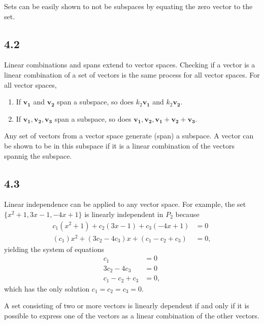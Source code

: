 \documentclass{article}
\begin{document}
    Sets can be easily shown to not be subspaces by equating the zero vector to the set.

    \subsection*{4.2}
    Linear combinations and spans extend to vector spaces. 
    Checking if a vector is a linear combination of a set of vectors 
    is the same process for all vector spaces.
    For all vector spaces,
    \begin{enumerate}
        \item If $\mathbf{v_1}$ and $\mathbf{v_2}$ span a subspace, so does $k_2 \mathbf{v_1}$ and $k_2 \mathbf{v_2}$.
        \item If $\mathbf{v_1, v_2, v_3}$ span a subspace, so does $\mathbf{v_1, v_2, v_1 + v_2 + v_3}$.
    \end{enumerate}

    Any set of vectors from a vector space generate (span) a subspace.
    A vector can be shown to be in this subspace if it is a linear combination of the vectors spannig the subspace.

    \subsection*{4.3}
    Linear independence can be applied to any vector space.
    For example, 
    the set $\{x^2 + 1, 3x - 1, -4x +  1\}$ is linearly independent in $P_2$ 
    because 
    \begin{align*}
        c_1(x^2 + 1) + c_2(3x - 1) + c_3(-4x + 1) &= 0 \\
        (c_1)x^2 + (3c_2 - 4c_3)x + (c_1 - c_2 + c_3) &= 0,
    \end{align*}
    yielding the system of equations
    \begin{align*}
        c_1 &= 0 \\
        3c_2 - 4c_3 &= 0 \\
        c_1 - c_2 + c_3 &= 0,
    \end{align*}
    which has the only solution $c_1 = c_2 = c_3 = 0$.

    A set consisting of two or more vectors is linearly dependent if and only if  
    it is possible to express one of the vectors as a linear combination of the other vectors.
    
\end{document}
